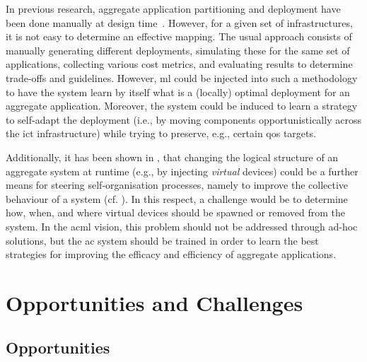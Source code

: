 In previous research, aggregate application partitioning and deployment have been done manually at design time~\cite{DBLP:journals/fi/CasadeiPPVW20}.
%
However, for a given set of infrastructures, it is not easy to determine an effective mapping.
%
The usual approach consists of manually generating different deployments,
 simulating these for the same set of applications,
 collecting various cost metrics,
 and evaluating results to determine trade-offs and guidelines.
%
However, \ac{ml} could be injected into 
 such a methodology
 to have the system learn by itself what is a
 (locally) optimal deployment for an aggregate application.
% 
Moreover, the system could be induced to learn a strategy to self-adapt the deployment (i.e., by moving components opportunistically across the \ac{ict} infrastructure) 
 while trying to preserve, e.g., certain \ac{qos} targets.
 
Additionally,
 it has been shown in \cite{casadei2022applsci},
 that changing the logical structure of an aggregate system at runtime
 (e.g., by injecting \emph{virtual} devices)
 could be a further means 
 for steering self-organisation processes,
 namely to improve the collective behaviour of a system (cf. \cite{DBLP:journals/jnca/LiS11}).
%
In this respect,
 a challenge would be to determine
 how, when, and where 
 virtual devices
 should be spawned or removed
 from the system.
%
In the \ac{acml} vision,
 this problem should not be addressed
 through ad-hoc solutions,
 but the \ac{ac} system should be trained
 in order to learn the best strategies
 for improving the efficacy and efficiency
 of aggregate applications.


\section{Opportunities and Challenges}


\subsection*{Opportunities}

